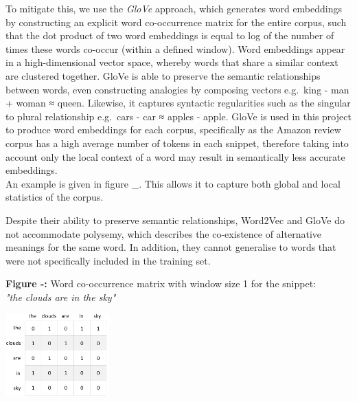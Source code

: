 \documentclass[12pt,a4paper]{article}
\begin{document}
To mitigate this, we use the \textit{GloVe} \cite{pennington2014glove} approach, which generates word embeddings by constructing an explicit word co-occurrence matrix for the entire corpus, such that the dot product of two word embeddings is equal to log of the number of times these words co-occur (within a defined window). Word embeddings appear in a high-dimensional vector space, whereby words that share a similar context are clustered together. GloVe is able to preserve the semantic relationships between words, even constructing analogies by composing vectors e.g.\ king - man + woman ≈ queen. Likewise, it captures syntactic regularities such as the singular to plural relationship e.g.\ cars - car ≈ apples - apple. GloVe is used in this project to produce word embeddings for each corpus, specifically as the Amazon review corpus has a high average number of tokens in each snippet, therefore taking into account only the local context of a word may result in  semantically less accurate embeddings.\\





 
 An example is given in figure \_. This allows it to capture both global and local statistics of the corpus. 

Despite their ability to preserve semantic relationships, Word2Vec and GloVe do not accommodate polysemy, which describes the co-existence of alternative meanings for the same word. In addition, they cannot generalise to words that were not specifically included in the training set.

\begin{center}
	\textbf{Figure -:} Word co-occurrence matrix with window size 1 for the snippet:\\ \textit{"the clouds are in the sky"}
\end{center}
\begin{center}
	\includegraphics[width=0.3\textwidth]{Images/glovediagram.png}
	\label{GloVe Pipeline}
\end{center}
\end{document}
